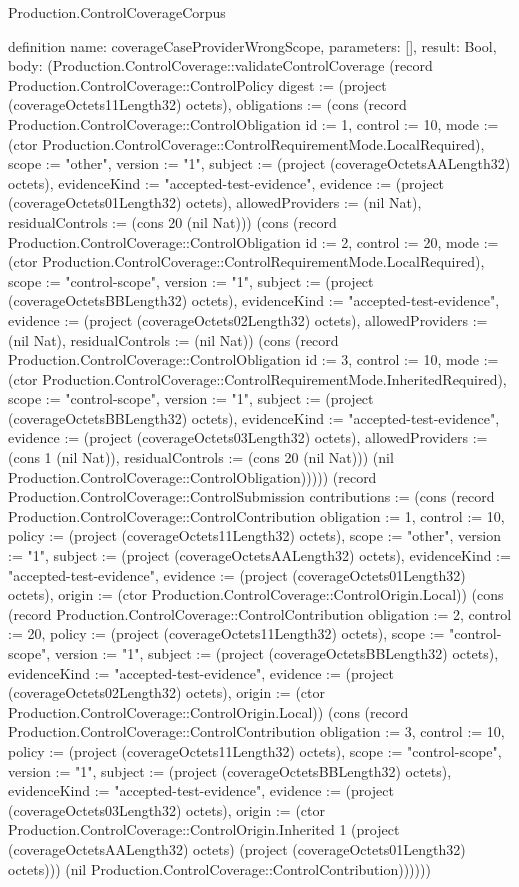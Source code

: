 \begin{lexlean}{Production.ControlCoverageCorpus}
\begin{semanticmodule}
definition{
  name: coverageCaseProviderWrongScope,
  parameters: [],
  result: Bool,
  body: (Production.ControlCoverage::validateControlCoverage (record Production.ControlCoverage::ControlPolicy {digest := (project (coverageOctets11Length32) octets), obligations := (cons (record Production.ControlCoverage::ControlObligation {id := 1, control := 10, mode := (ctor Production.ControlCoverage::ControlRequirementMode.LocalRequired), scope := "other", version := "1", subject := (project (coverageOctetsAALength32) octets), evidenceKind := "accepted-test-evidence", evidence := (project (coverageOctets01Length32) octets), allowedProviders := (nil Nat), residualControls := (cons 20 (nil Nat))}) (cons (record Production.ControlCoverage::ControlObligation {id := 2, control := 20, mode := (ctor Production.ControlCoverage::ControlRequirementMode.LocalRequired), scope := "control-scope", version := "1", subject := (project (coverageOctetsBBLength32) octets), evidenceKind := "accepted-test-evidence", evidence := (project (coverageOctets02Length32) octets), allowedProviders := (nil Nat), residualControls := (nil Nat)}) (cons (record Production.ControlCoverage::ControlObligation {id := 3, control := 10, mode := (ctor Production.ControlCoverage::ControlRequirementMode.InheritedRequired), scope := "control-scope", version := "1", subject := (project (coverageOctetsBBLength32) octets), evidenceKind := "accepted-test-evidence", evidence := (project (coverageOctets03Length32) octets), allowedProviders := (cons 1 (nil Nat)), residualControls := (cons 20 (nil Nat))}) (nil Production.ControlCoverage::ControlObligation))))}) (record Production.ControlCoverage::ControlSubmission {contributions := (cons (record Production.ControlCoverage::ControlContribution {obligation := 1, control := 10, policy := (project (coverageOctets11Length32) octets), scope := "other", version := "1", subject := (project (coverageOctetsAALength32) octets), evidenceKind := "accepted-test-evidence", evidence := (project (coverageOctets01Length32) octets), origin := (ctor Production.ControlCoverage::ControlOrigin.Local)}) (cons (record Production.ControlCoverage::ControlContribution {obligation := 2, control := 20, policy := (project (coverageOctets11Length32) octets), scope := "control-scope", version := "1", subject := (project (coverageOctetsBBLength32) octets), evidenceKind := "accepted-test-evidence", evidence := (project (coverageOctets02Length32) octets), origin := (ctor Production.ControlCoverage::ControlOrigin.Local)}) (cons (record Production.ControlCoverage::ControlContribution {obligation := 3, control := 10, policy := (project (coverageOctets11Length32) octets), scope := "control-scope", version := "1", subject := (project (coverageOctetsBBLength32) octets), evidenceKind := "accepted-test-evidence", evidence := (project (coverageOctets03Length32) octets), origin := (ctor Production.ControlCoverage::ControlOrigin.Inherited 1 (project (coverageOctetsAALength32) octets) (project (coverageOctets01Length32) octets))}) (nil Production.ControlCoverage::ControlContribution))))}))
}


\end{semanticmodule}
\end{lexlean}

